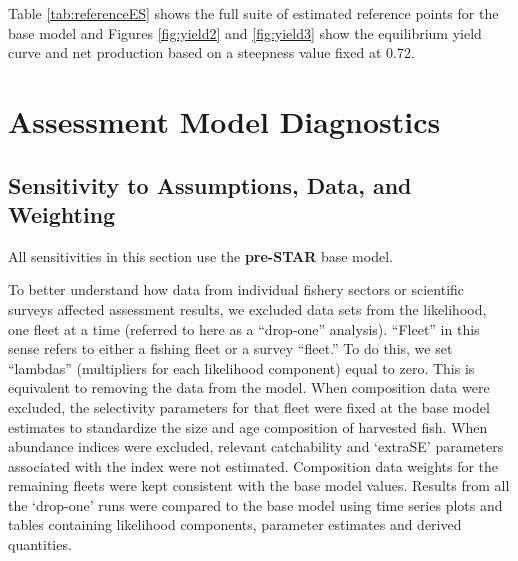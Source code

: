 \documentclass[11pt,
  english,
]{article}
\begin{document}
Table \ref{tab:referenceES} shows the full suite of estimated reference points for the base model and Figures \ref{fig:yield2} and \ref{fig:yield3} show the equilibrium yield curve and net production based on a steepness value fixed at 0.72.


\hypertarget{assessment-model-diagnostics}{%
\section{Assessment Model Diagnostics}\label{assessment-model-diagnostics}}

\leavevmode\tagmcend\tagstructend


\hypertarget{sensitivity-to-assumptions-data-and-weighting}{%
\subsection{Sensitivity to Assumptions, Data, and Weighting}\label{sensitivity-to-assumptions-data-and-weighting}}

\leavevmode\tagmcend\tagstructend

All sensitivities in this section use the \textbf{pre-STAR} base model.

To better understand how data from individual fishery sectors or scientific surveys affected assessment results, we excluded data sets from the likelihood, one fleet at a time (referred to here as a ``drop-one'' analysis). ``Fleet'' in this sense refers to either a fishing fleet or a survey ``fleet.'' To do this, we set ``lambdas'' (multipliers for each likelihood component) equal to zero. This is equivalent to removing the data from the model. When composition data were excluded, the selectivity parameters for that fleet were fixed at the base model estimates to standardize the size and age composition of harvested fish. When abundance indices were excluded, relevant catchability and `extraSE' parameters associated with the index were not estimated. Composition data weights for the remaining fleets were kept consistent with the base model values. Results from all the `drop-one' runs were compared to the base model using time series plots and tables containing likelihood components, parameter estimates and derived quantities.
\end{document}
